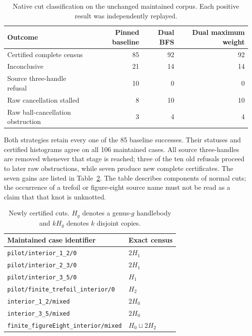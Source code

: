 \begin{table}[htbp]
\centering
\caption{Native cut classification on the unchanged maintained corpus.
Each positive result was independently replayed.}
\label{tab:corpus-results}
\begin{tabular}{lrrr}
\toprule
Outcome & Pinned baseline & Dual BFS & Dual maximum weight\\
\midrule
Certified complete census & 85 & 92 & 92\\
Inconclusive & 21 & 14 & 14\\
\quad Source three-handle refusal & 10 & 0 & 0\\
\quad Raw cancellation stalled & 8 & 10 & 10\\
\quad Raw ball-cancellation obstruction & 3 & 4 & 4\\
\bottomrule
\end{tabular}
\end{table}

Both strategies retain every one of the 85 baseline successes. Their
statuses and certified histograms agree on all 106 maintained cases.
All source three-handles are removed whenever that stage is reached;
three of the ten old refusals proceed to later raw obstructions, while
seven produce new complete certificates. The seven gains are listed in
Table~\ref{tab:new-cases}. The table describes components of normal cuts;
the occurrence of a trefoil or figure-eight source name must not be read
as a claim that that knot is unknotted.

\begin{table}[htbp]
\centering\small
\caption{Newly certified cuts. $H_g$ denotes a genus-$g$ handlebody and
$kH_g$ denotes $k$ disjoint copies.}
\label{tab:new-cases}
\begin{tabular}{ll}
\toprule
Maintained case identifier & Exact census\\
\midrule
\texttt{pilot/interior\_1\_2/0} & $2H_1$\\
\texttt{pilot/interior\_2\_3/0} & $2H_1$\\
\texttt{pilot/interior\_3\_5/0} & $H_1$\\
\texttt{pilot/finite\_trefoil\_interior/0} & $H_2$\\
\texttt{interior\_1\_2/mixed} & $2H_0$\\
\texttt{interior\_3\_5/mixed} & $2H_0$\\
\texttt{finite\_figureEight\_interior/mixed} & $H_0\sqcup2H_2$\\
\bottomrule
\end{tabular}
\end{table}

